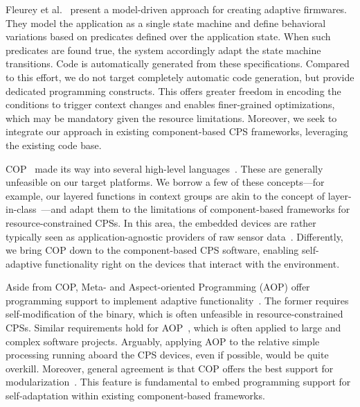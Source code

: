 Fleurey et al.~\cite{Fleureya-adaptive-firmwares11} present a
model-driven approach for creating adaptive firmwares. They model the
application as a single state machine and define behavioral variations
based on predicates defined over the application state. When such
predicates are found true, the system accordingly adapt the state
machine transitions. Code is automatically generated from these
specifications. Compared to this effort, we do not target completely
automatic code generation, but provide dedicated programming
constructs. This offers greater freedom in encoding the conditions to
trigger context changes and enables finer-grained optimizations, which
may be mandatory given the resource limitations. Moreover, we seek to
integrate our approach in existing component-based CPS frameworks,
leveraging the existing code base.

COP~\cite{Hirschfeld08} made its way into several high-level
languages~\cite{Bardram05,Ghezzi10,Kamina11,Salvaneschi12,Sehic11}. These
are generally unfeasible on our target platforms. We
borrow a few of these concepts---for example, our layered functions in
context groups are akin to the concept of
layer-in-class~\cite{Salvaneschi12}---and adapt them to the
limitations of component-based frameworks for resource-constrained
CPSs. In this area, the embedded devices are rather typically seen as
application-agnostic providers of raw sensor
data~\cite{Sehic11}. Differently, we bring COP down to the
component-based CPS software, enabling self-adaptive functionality
right on the devices that interact with the environment.

Aside from COP, Meta- and Aspect-oriented Programming (AOP) offer
programming support to implement adaptive
functionality~\cite{SalvaneschiTBP}. The former requires
self-modification of the binary, which is often unfeasible in
resource-constrained CPSs. Similar requirements hold for
AOP~\cite{Kiczales:AOP:97}, which is often applied to large and
complex software projects. Arguably, applying AOP to the relative
simple processing running aboard the CPS devices, even if possible,
would be quite overkill. Moreover, general agreement is that COP
offers the best support for modularization~\cite{SalvaneschiTBP}. This
feature is fundamental to embed programming support for
self-adaptation within existing component-based frameworks.


